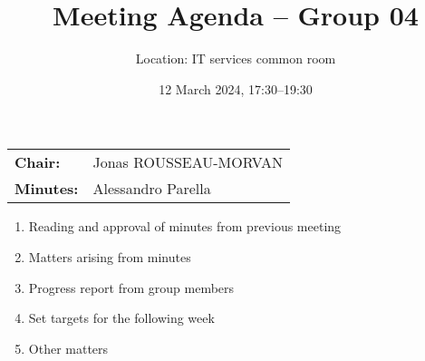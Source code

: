 \documentclass{cce2014-meetings}
\title{Meeting Agenda -- Group 04}
\author{Location: IT services common room}
\date{12 March 2024, 17:30--19:30}
\begin{document}
\maketitle
\begin{center}
        \begin{tabular}{ll}
                \textbf{Chair:}   & Jonas ROUSSEAU-MORVAN  \\
                \textbf{Minutes:} & Alessandro Parella
        \end{tabular}
\end{center}

\begin{enumerate}

        \item Reading and approval of minutes from previous meeting

        \item Matters arising from minutes

        \item Progress report from group members

        \item Set targets for the following week

        \item Other matters

\end{enumerate}
\end{document}
